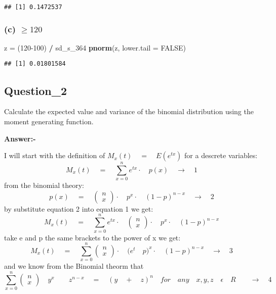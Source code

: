 \documentclass[]{article}
\newenvironment{Shaded}{\begin{snugshade}}{\end{snugshade}}
\newcommand{\DataTypeTok}[1]{\textcolor[rgb]{0.13,0.29,0.53}{#1}}
\newcommand{\DecValTok}[1]{\textcolor[rgb]{0.00,0.00,0.81}{#1}}
\newcommand{\KeywordTok}[1]{\textcolor[rgb]{0.13,0.29,0.53}{\textbf{#1}}}
\newcommand{\NormalTok}[1]{#1}
\newcommand{\OperatorTok}[1]{\textcolor[rgb]{0.81,0.36,0.00}{\textbf{#1}}}
\newcommand{\OtherTok}[1]{\textcolor[rgb]{0.56,0.35,0.01}{#1}}
\newcommand{\StringTok}[1]{\textcolor[rgb]{0.31,0.60,0.02}{#1}}
\begin{document}
\begin{verbatim}
## [1] 0.1472537
\end{verbatim}

\hypertarget{c-ge-120}{%
\subsubsection{\texorpdfstring{(c)
\(\ge 120\)}{(c) \textbackslash ge 120}}\label{c-ge-120}}

\begin{Shaded}
\begin{Highlighting}[]
\NormalTok{z =}\StringTok{ }\NormalTok{(}\DecValTok{120-100}\NormalTok{) }\OperatorTok{/}\StringTok{ }\NormalTok{sd_s_}\DecValTok{364}
\KeywordTok{pnorm}\NormalTok{(z, }\DataTypeTok{lower.tail =} \OtherTok{FALSE}\NormalTok{)}
\end{Highlighting}
\end{Shaded}

\begin{verbatim}
## [1] 0.01801584
\end{verbatim}

\hypertarget{question_2}{%
\subsection{Question\_2}\label{question_2}}

Calculate the expected value and variance of the binomial distribution
using the moment generating function.

\textbf{Answer:-}

I will start with the definition of
\({ M }_{ x }(t)\quad =\quad E({ e }^{ tx })\) for a descrete variables:
\[{ M }_{ x }(t)\quad =\quad \sum _{ x=0 }^{ n }{ { e }^{ tx } } \cdot \quad p(x)\quad \longrightarrow \quad 1\]
from the binomial theory:
\[p(x)\quad =\quad \begin{pmatrix} n \\ x \end{pmatrix}\cdot { \quad p }^{ x }\cdot \quad { (1-p) }^{ n-x }\quad \rightarrow \quad 2\]
by substitute equation 2 into equation 1 we get:
\[{ M }_{ x }(t)\quad =\quad \sum _{ x=0 }^{ n }{ { e }^{ tx } } \cdot \quad \begin{pmatrix} n \\ x \end{pmatrix}\cdot { \quad p }^{ x }\cdot \quad { (1-p) }^{ n-x }\]
take e and p the same brackets to the power of x we get:
\[{ M }_{ x }(t)\quad =\quad \sum _{ x=0 }^{ n }{ \begin{pmatrix} n \\ x \end{pmatrix} } \cdot \quad ({ e }^{ t }{ \quad p) }^{ x }\cdot \quad { (1-p) }^{ n-x }\quad \rightarrow \quad 3\]
and we know from the Binomial theorm that
\[\sum _{ x=0 }^{ n }{ \begin{pmatrix} n \\ x \end{pmatrix} } { \quad y }^{ x }\quad { \quad z }^{ n-x }\quad =\quad { (y\quad +\quad z) }^{ n }\quad for\quad any\quad x,y,z\quad \epsilon \quad R\quad \quad \rightarrow \quad 4\]
\end{document}
